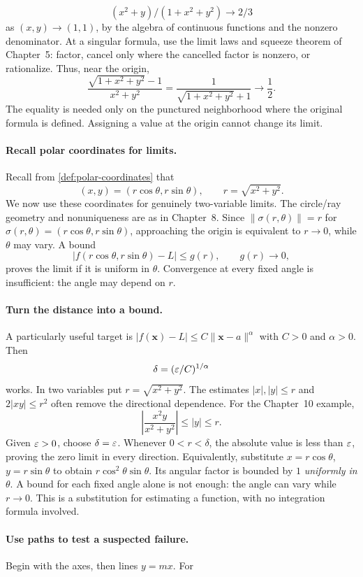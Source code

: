 \[
(x^2+y)/(1+x^2+y^2)\to2/3
\]
 as $(x,y)\to(1,1)$, by the algebra of
continuous functions and the nonzero denominator. At a singular formula,
use the limit laws and squeeze theorem of Chapter~5: factor, cancel only
where the cancelled factor is nonzero, or rationalize. Thus, near the origin,
\[
\frac{\sqrt{1+x^2+y^2}-1}{x^2+y^2}
=\frac{1}{\sqrt{1+x^2+y^2}+1}\longrightarrow\frac12.
\]
The equality is needed only on the punctured neighborhood where the original
formula is defined. Assigning a value at the origin cannot change its limit.

\paragraph{Recall polar coordinates for limits.}
Recall from \cref{def:polar-coordinates} that
\[
(x,y)=(r\cos\theta,r\sin\theta),\qquad r=\sqrt{x^2+y^2}.
\]
We now use these coordinates for genuinely two-variable limits. The
circle/ray geometry and nonuniqueness are as in Chapter~8. Since
$\|\sigma(r,\theta)\|=r$ for $\sigma(r,\theta)=(r\cos\theta,r\sin\theta)$,
approaching the origin is equivalent to $r\to0$, while $\theta$ may vary.
A bound
\[
|f(r\cos\theta,r\sin\theta)-L|\leq g(r),\qquad g(r)\longrightarrow0,
\]
proves the limit if it is uniform in $\theta$. Convergence at every
fixed angle is insufficient: the angle may depend on $r$.

\paragraph{Turn the distance into a bound.}
A particularly useful target is $|f(\mathbf{x})-L|\leq C\|\mathbf{x}-a\|^\alpha$ with
$C>0$ and $\alpha>0$. Then
\[
\delta=(\varepsilon/C)^{1/\alpha}
\]
 works.
In two variables put $r=\sqrt{x^2+y^2}$. The estimates
$|x|,|y|\leq r$ and $2|xy|\leq r^2$ often remove the directional dependence.
For the Chapter~10 example,
\[
\left|\frac{x^2y}{x^2+y^2}\right|\leq |y|\leq r.
\]
Given $\varepsilon>0$, choose $\delta=\varepsilon$. Whenever $0<r<\delta$, the
absolute value is less than $\varepsilon$, proving the zero limit in every direction.
Equivalently, substitute $x=r\cos\theta$, $y=r\sin\theta$ to obtain
$r\cos^2\theta\sin\theta$. Its angular factor is bounded by $1$
\emph{uniformly in $\theta$}. A bound for each fixed angle alone is not
enough: the angle can vary while $r\to0$. This is a substitution for
estimating a function, with no integration formula involved.

\paragraph{Use paths to test a suspected failure.}
Begin with the axes, then lines $y=mx$. For

